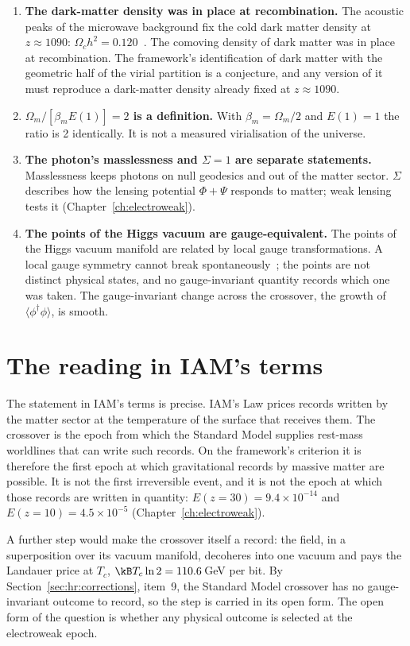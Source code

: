 \begin{enumerate}
\item \textbf{The dark-matter density was in place at recombination.} The acoustic peaks of the microwave background fix the cold dark matter
density at $z\approx1090$: $\Omega_ch^2=0.120$~\cite{Planck2018VI}. The comoving density of dark matter was in place at recombination. \observed{} The
framework's identification of dark matter with the geometric half of the virial partition is a conjecture, and any version of it must reproduce
a dark-matter density already fixed at $z\approx1090$. \conjecture
\item \textbf{$\Omega_m/[\beta_mE(1)]=2$ is a definition.} With $\beta_m=\Omega_m/2$ and $E(1)=1$ the ratio is 2 identically. It is not a measured
virialisation of the universe. \derived
\item \textbf{The photon's masslessness and $\Sigma=1$ are separate statements.} Masslessness keeps photons on null geodesics and out of the matter sector. $\Sigma$
describes how the lensing potential $\Phi+\Psi$ responds to matter; weak lensing tests it (Chapter~\ref{ch:electroweak}). \derived
\item \textbf{The points of the Higgs vacuum are gauge-equivalent.} The points of the Higgs vacuum manifold are related by local gauge transformations. A local gauge
symmetry cannot break spontaneously~\cite{Elitzur1975}; the points are not distinct physical states, and no gauge-invariant quantity records which
one was taken. The gauge-invariant change across the crossover, the growth of $\langle\phi^\dagger\phi\rangle$, is smooth. \derived
\end{enumerate}

\section{The reading in IAM's terms}\label{sec:hr:reading}
The statement in IAM's terms is precise. IAM's Law prices records written by the matter sector at the temperature of the surface that receives
them. The crossover is the epoch from which the Standard Model supplies rest-mass worldlines that can write such records. On the framework's
criterion it is therefore the first epoch at which gravitational records by massive matter are possible. \interp{} It is not the first irreversible
event, and it is not the epoch at which those records are written in quantity: $E(z{=}30)=9.4\times10^{-14}$ and $E(z{=}10)=4.5\times10^{-5}$
(Chapter~\ref{ch:electroweak}). \calc

A further step would make the crossover itself a record: the field, in a superposition over its vacuum manifold, decoheres into one vacuum and pays
the Landauer price at $T_c$, $\kB T_c\ln2=110.6$\,GeV per bit. \calc{} By Section~\ref{sec:hr:corrections}, item~9, the Standard Model crossover has no gauge-invariant outcome to record, so the step is carried in its
open form. \conjecture{} The open form of the question is whether any physical outcome is selected at the electroweak epoch. \openprob

